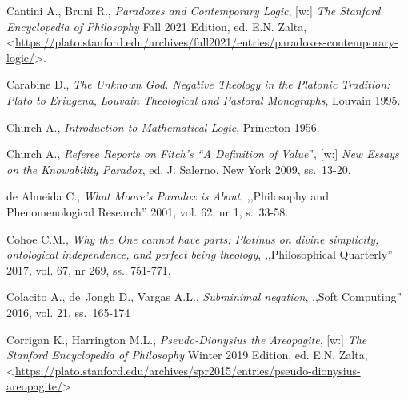 \begin{thebibliography}{100}
Cantini A., Bruni R., \textit{Paradoxes and Contemporary Logic}, [w:] \textit{The Stanford Encyclopedia of Philosophy}
Fall 2021 Edition, ed. E.N. Zalta, {\textless}\url{https://plato.stanford.edu/archives/fall2021/entries/paradoxes-contemporary-logic/}{\textgreater}.

Carabine D., \textit{The Unknown God. Negative Theology in the Platonic Tradition: Plato to Eriugena}, \textit{Louvain Theological and Pastoral Monographs}, Louvain 1995.



Church A., \textit{Introduction to Mathematical Logic}, Princeton 1956.

Church A., \textit{Referee Reports on Fitch's ``A Definition of Value}'', [w:] \textit{New Essays on the Knowability Paradox},
ed. J. Salerno, New York 2009, ss.~13-20.

de Almeida C., \textit{What Moore's Paradox is About}, ,,Philosophy and Phenomenological Research'' 2001, vol. 62, nr 1, s.~33-58.

Cohoe C.M., \textit{Why the One cannot have parts: Plotinus on divine simplicity, ontological independence, and perfect being theology}, ,,Philosophical Quarterly'' 2017, vol. 67, nr 269, ss.~751-771.


Colacito A., de~Jongh D., Vargas A.L., \textit{Subminimal negation}, ,,Soft Computing'' 2016, vol. 21, ss.~165-174


Corrigan K., Harrington  M.L., \textit{Pseudo-Dionysius the Areopagite}, [w:] \textit{The Stanford Encyclopedia of Philosophy}
Winter 2019 Edition, ed. E.N. Zalta, {\textless}\url{https://plato.stanford.edu/archives/spr2015/entries/pseudo-dionysius-areopagite/}{\textgreater}


\end{thebibliography}
